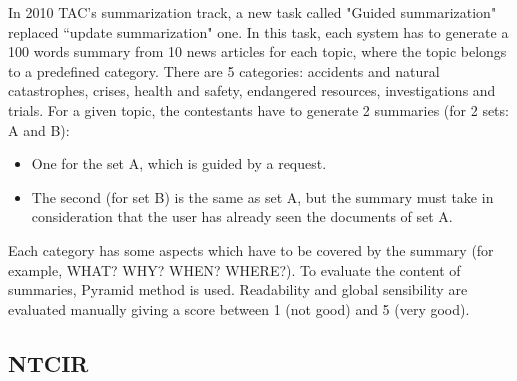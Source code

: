 In 2010 TAC's summarization track, a new task called "Guided summarization" replaced ``update summarization" one.
In this task, each system has to generate a 100 words summary from 10 news articles for each topic, where the topic belongs to a predefined category.
There are 5 categories: accidents and natural catastrophes, crises, health and safety, endangered resources, investigations and trials.
For a given topic, the contestants have to generate 2 summaries (for 2 sets: A and B):
\begin{itemize}
	\item One for the set A, which is guided by a request.
	\item The second (for set B) is the same as set A, but the summary must take in consideration that the user has already seen the documents of set A.
\end{itemize}
Each category has some aspects which have to be covered by the summary (for example, WHAT? WHY? WHEN? WHERE?).
To evaluate the content of summaries, Pyramid method is used. 
Readability and global sensibility are evaluated manually giving a score between 1 (not good) and 5 (very good).

\subsection{NTCIR}

